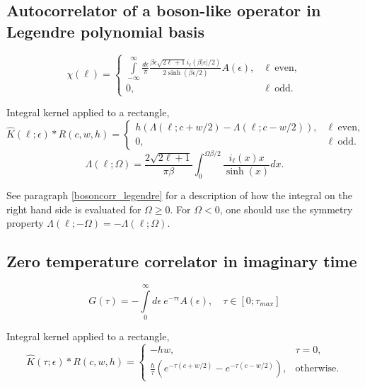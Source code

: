 \documentclass[]{article}
\begin{document}
\subsection{Autocorrelator of a boson-like operator in Legendre polynomial basis}
\label{bosonautocorr_legendre}
\begin{equation}
	\chi(\ell) = \left\{
		\begin{array}{ll}
		\int\limits_{-\infty}^\infty
		\frac{d\epsilon}{\pi}
		\frac{\beta\epsilon\sqrt{2\ell+1} i_{\ell}(\beta|\epsilon|/2)}
		{2\sinh(\beta\epsilon/2)} A(\epsilon), &\ell\ \mathrm{ even},\\
		0, &\ell\ \mathrm{odd}.
	\end{array}\right.
\end{equation}

Integral kernel applied to a rectangle,
\begin{equation}
	\hat K(\ell;\epsilon)*R(c,w,h) = \left\{
	\begin{array}{ll}
	h(\Lambda(\ell;c+w/2)-\Lambda(\ell;c-w/2)), &\ell\ \mathrm{ even},\\
	0, &\ell\ \mathrm{odd}.
	\end{array}\right.
\end{equation}
\begin{equation}
	\Lambda(\ell;\Omega) =
	\frac{2\sqrt{2\ell+1}}{\pi\beta}
	\int_0^{\Omega\beta/2} \frac{i_\ell(x) x}{\sinh(x)} dx.
\end{equation}

See paragraph \ref{bosoncorr_legendre} for a description of how the integral on
the right hand side is evaluated for $\Omega\geq0$. For $\Omega<0$, one should use the symmetry property $\Lambda(\ell;-\Omega) = -\Lambda(\ell;\Omega)$.

\subsection{Zero temperature correlator in imaginary time}
\label{zerotemp_imtime}
\begin{equation}
	G(\tau) = -\int\limits_0^\infty
	d\epsilon\ e^{-\tau\epsilon} A(\epsilon), \quad
	\tau\in[0;\tau_{max}]
\end{equation}

Integral kernel applied to a rectangle,
\begin{equation}
	\hat K(\tau;\epsilon)*R(c,w,h) =  \left\{
	\begin{array}{ll}
		-hw, &\tau=0,\\
		\frac{h}{\tau}(e^{-\tau(c+w/2)}-e^{-\tau(c-w/2)}) ,&\mathrm{otherwise}.
	\end{array}\right.
\end{equation}
\end{document}
